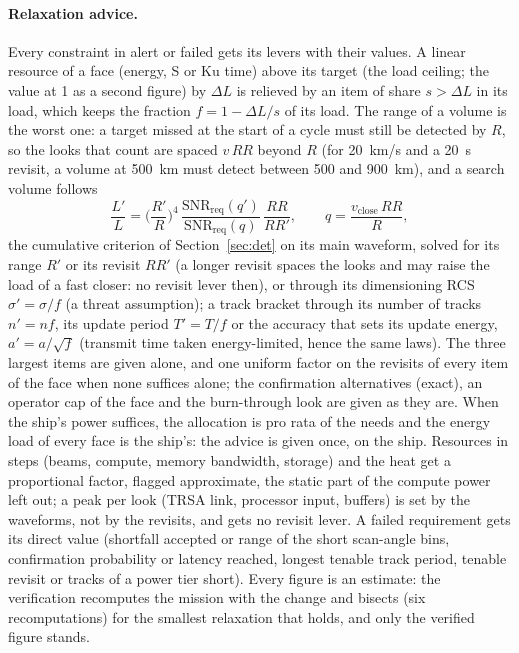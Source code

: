 \documentclass[11pt,a4paper]{article}
\begin{document}
\paragraph{Relaxation advice.} Every constraint in alert or failed gets its levers with their values. A linear resource
of a face (energy, S or Ku time) above its target (the load ceiling; the value at 1 as a second figure) by $\Delta L$ is
relieved by an item of share $s>\Delta L$ in its load, which keeps the fraction $f=1-\Delta L/s$ of its load. The range
of a volume is the worst one: a target missed at the start of a cycle must still be detected by $R$, so the looks that
count are spaced $v\,RR$ beyond $R$ (for 20~km/s and a 20~s revisit, a volume at 500~km must detect between 500 and
900~km), and a search volume follows
\[ \frac{L'}{L}=\Big(\frac{R'}{R}\Big)^4\,\frac{\mathrm{SNR}_\mathrm{req}(q')}{\mathrm{SNR}_\mathrm{req}(q)}\,
\frac{RR}{RR'},\qquad q=\frac{v_\mathrm{close}\,RR}{R}, \]
the cumulative criterion of Section~\ref{sec:det} on its main waveform, solved for its range $R'$ or its revisit
$RR'$ (a longer revisit spaces the looks and may raise the load of a fast closer: no revisit lever then), or through
its dimensioning RCS $\sigma'=\sigma/f$ (a threat assumption); a track bracket through its number of tracks $n'=nf$, its update period $T'=T/f$ or the accuracy that
sets its update energy, $a'=a/\sqrt f$ (transmit time taken energy-limited, hence the same laws). The three largest
items are given alone, and one uniform factor on the revisits of every item of the face when none suffices alone; the
confirmation alternatives (exact), an operator cap of the face and the burn-through look are given as they are. When
the ship's power suffices, the allocation is pro rata of the needs and the energy load of every face is the ship's: the
advice is given once, on the ship. Resources in steps (beams, compute, memory bandwidth, storage) and the heat get a
proportional factor, flagged approximate, the static part of the compute power left out; a peak per look (TRSA link,
processor input, buffers) is set by the waveforms, not by the revisits, and gets no revisit lever. A failed requirement
gets its direct value (shortfall accepted or range of the short scan-angle bins, confirmation probability or latency
reached, longest tenable track period, tenable revisit or tracks of a power tier short). Every figure is an estimate:
the verification recomputes the mission with the change and bisects (six recomputations) for the smallest relaxation
that holds, and only the verified figure stands.
\end{document}
